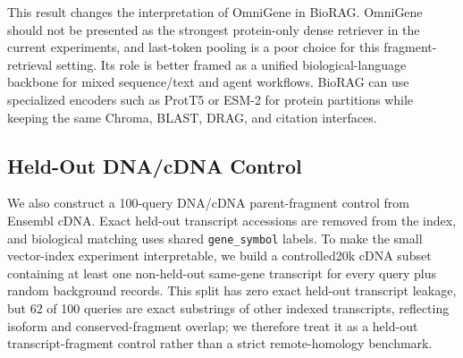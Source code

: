 \documentclass[11pt]{article}
\begin{document}
\begin{table}[t]
\centering
\caption{Held-out parent-fragment protein retrieval on the controlled20k index. Vector rows use sequence-window Chroma retrieval with a top-200 candidate pool.}
\label{tab:protein_baselines}
\end{table}

This result changes the interpretation of OmniGene in BioRAG. OmniGene should not be presented as the strongest protein-only dense retriever in the current experiments, and last-token pooling is a poor choice for this fragment-retrieval setting. Its role is better framed as a unified biological-language backbone for mixed sequence/text and agent workflows. BioRAG can use specialized encoders such as ProtT5 or ESM-2 for protein partitions while keeping the same Chroma, BLAST, DRAG, and citation interfaces.

\subsection{Held-Out DNA/cDNA Control}

We also construct a 100-query DNA/cDNA parent-fragment control from Ensembl cDNA. Exact held-out transcript accessions are removed from the index, and biological matching uses shared \texttt{gene\_symbol} labels. To make the small vector-index experiment interpretable, we build a controlled20k cDNA subset containing at least one non-held-out same-gene transcript for every query plus random background records. This split has zero exact held-out transcript leakage, but 62 of 100 queries are exact substrings of other indexed transcripts, reflecting isoform and conserved-fragment overlap; we therefore treat it as a held-out transcript-fragment control rather than a strict remote-homology benchmark.
\end{document}
